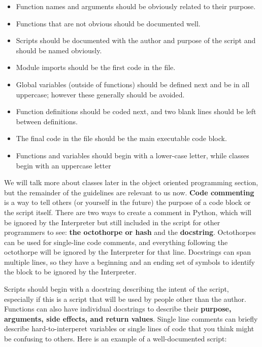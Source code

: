 \documentclass[a4paper,11pt]{article}
\begin{document}
\begin{itemize}
 \item Function names and arguments should be obviously related to their purpose.
 \item Functions that are not obvious should be documented well.
 \item Scripts should be documented with the author and purpose of the script and should be named obviously.
 \item Module imports should be the first code in the file.
 \item Global variables (outside of functions) should be defined next and be in all uppercase; however 
 these generally should be avoided.
 \item Function definitions should be coded next, and two blank lines should be left between definitions.
 \item The final code in the file should be the main executable code block.
 \item Functions and variables should begin with a lower-case letter, while classes begin with an uppercase letter
\end{itemize}

We will talk more about classes later in the object oriented programming section, but the remainder of the 
guidelines are relevant to us now.  \textbf{Code commenting} is a way to tell others (or yourself in the future) 
the purpose of a code block or the script itself.  There are two ways to create a comment in Python, which will 
be ignored by the Interpreter but still included in the script for other programmers to see: \textbf{the octothorpe 
or hash} and the \textbf{docstring}.  Octothorpes can be used for single-line code comments, and everything following 
the octothorpe will be ignored by the Interpreter for that line.  Docstrings can span multiple lines, so they have a 
beginning and an ending set of symbols to identify the block to be ignored by the Interpreter.  \par

Scripts should begin with a docstring describing the intent of the script, especially if this is a script 
that will be used by people other than the author.  Functions can also have individual docstrings to 
describe their \textbf{purpose, arguments, side effects, and return values}.  Single line comments 
can briefly describe hard-to-interperet variables or single lines of code that you think might be 
confusing to others.  Here is an example of a well-documented script:
\end{document}
